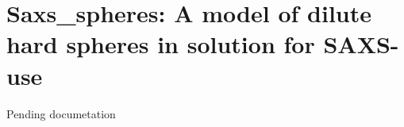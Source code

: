 \section{Saxs\_spheres: A model of dilute hard spheres in solution for SAXS-use}
\label{saxs_spheres}


Pending documetation
